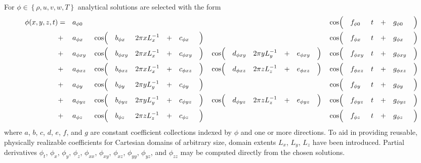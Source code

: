 For $\phi\in\left\{\rho, u, v, w, T\right\}$ analytical solutions are selected
with the form
\begin{alignat}{20}%
  \phi\!\left(x, y, z, t\right)
  &= &&a_{\phi{}0}  &&          &&             &&               &&  &&            &&       &&          &&             &&                &&  &&            &&        &&\cos\Bigl(&&f_{\phi{}0 } &&t &&+ &&g_{\phi{}0 }&&\Bigr) \notag\\
  &+ &&a_{\phi{}x } &&\cos\Bigl(&&b_{\phi{}x } &&2\pi x L_x^{-1}&&+ &&c_{\phi{}x }&&\Bigr) &&          &&             &&                &&  &&            &&        &&\cos\Bigl(&&f_{\phi{}x } &&t &&+ &&g_{\phi{}x }&&\Bigr) \notag\\
  &+ &&a_{\phi{}xy} &&\cos\Bigl(&&b_{\phi{}xy} &&2\pi x L_x^{-1}&&+ &&c_{\phi{}xy}&&\Bigr) &&\cos\Bigl(&&d_{\phi{}xy} &&2\pi y L_y^{-1} &&+ &&e_{\phi{}xy}&&\Bigr)  &&\cos\Bigl(&&f_{\phi{}xy} &&t &&+ &&g_{\phi{}xy}&&\Bigr) \notag\\
  &+ &&a_{\phi{}xz} &&\cos\Bigl(&&b_{\phi{}xz} &&2\pi x L_x^{-1}&&+ &&c_{\phi{}xz}&&\Bigr) &&\cos\Bigl(&&d_{\phi{}xz} &&2\pi z L_z^{-1} &&+ &&e_{\phi{}xz}&&\Bigr)  &&\cos\Bigl(&&f_{\phi{}xz} &&t &&+ &&g_{\phi{}xz}&&\Bigr) \notag\\
  &+ &&a_{\phi{}y } &&\cos\Bigl(&&b_{\phi{}y } &&2\pi y L_y^{-1}&&+ &&c_{\phi{}y }&&\Bigr) &&          &&             &&                &&  &&            &&        &&\cos\Bigl(&&f_{\phi{}y } &&t &&+ &&g_{\phi{}y }&&\Bigr) \notag\\
  &+ &&a_{\phi{}yz} &&\cos\Bigl(&&b_{\phi{}yz} &&2\pi y L_y^{-1}&&+ &&c_{\phi{}yz}&&\Bigr) &&\cos\Bigl(&&d_{\phi{}yz} &&2\pi z L_z^{-1} &&+ &&e_{\phi{}yz}&&\Bigr)  &&\cos\Bigl(&&f_{\phi{}yz} &&t &&+ &&g_{\phi{}yz}&&\Bigr) \notag\\
  &+ &&a_{\phi{}z } &&\cos\Bigl(&&b_{\phi{}z } &&2\pi z L_z^{-1}&&+ &&c_{\phi{}z }&&\Bigr) &&          &&             &&                &&  &&            &&        &&\cos\Bigl(&&f_{\phi{}z } &&t &&+ &&g_{\phi{}z }&&\Bigr) \notag
\end{alignat}
where $a$, $b$, $c$, $d$, $e$, $f$, and $g$ are constant coefficient
collections indexed by $\phi$ and one or more directions.  To aid in providing
reusable, physically realizable coefficients for Cartesian domains of arbitrary
size, domain extents $L_x$, $L_y$, $L_z$ have been introduced.
%
Partial derivatives $\phi_{t }$, $\phi_{x }$, $\phi_{y }$, $\phi_{z }$,
$\phi_{xx}$, $\phi_{xy}$, $\phi_{xz}$, $\phi_{yy}$, $\phi_{yz}$, and $\phi_{zz}$
may be computed directly from the chosen solutions.

